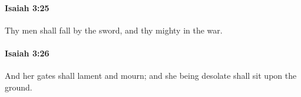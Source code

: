 		\paragraph{Isaiah 3:25} %
			\label{ISAIAH-3-25}

			Thy men shall fall by the sword, and thy mighty in the war.


		\paragraph{Isaiah 3:26} %
			\label{ISAIAH-3-26}

			And her gates shall lament and mourn; and she being desolate shall sit upon the ground.

